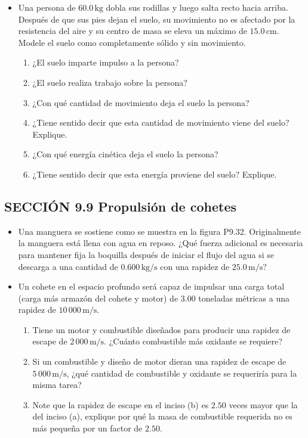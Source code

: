 \documentclass[11pt,a4paper]{article}
\begin{document}
\begin{itemize}
    \item[\textbf{31.}] Una persona de \(60.0\,\text{kg}\) dobla sus rodillas y luego salta recto hacia arriba. Después de que sus pies dejan el suelo, su movimiento no es afectado por la resistencia del aire y su centro de masa se eleva un máximo de \(15.0\,\text{cm}\). Modele el suelo como completamente sólido y sin movimiento.
    \begin{enumerate}
        \item ¿El suelo imparte impulso a la persona?
        \item ¿El suelo realiza trabajo sobre la persona?
        \item ¿Con qué cantidad de movimiento deja el suelo la persona?
        \item ¿Tiene sentido decir que esta cantidad de movimiento viene del suelo? Explique.
        \item ¿Con qué energía cinética deja el suelo la persona?
        \item ¿Tiene sentido decir que esta energía proviene del suelo? Explique.
    \end{enumerate}
    \vspace*{7cm}
\end{itemize}

\subsection*{SECCIÓN 9.9 Propulsión de cohetes}

\begin{itemize}
    \item[\textbf{32.}] Una manguera se sostiene como se muestra en la figura P9.32. Originalmente la manguera está llena con agua en reposo. ¿Qué fuerza adicional es necesaria para mantener fija la boquilla después de iniciar el flujo del agua si se descarga a una cantidad de \(0.600\,\text{kg/s}\) con una rapidez de \(25.0\,\text{m/s}\)?
    \vspace*{6cm}

    \item[\textbf{33.}] Un cohete en el espacio profundo será capaz de impulsar una carga total (carga más armazón del cohete y motor) de \(3.00\) toneladas métricas a una rapidez de \(10\,000\,\text{m/s}\).
    \begin{enumerate}
        \item Tiene un motor y combustible diseñados para producir una rapidez de escape de \(2\,000\,\text{m/s}\). ¿Cuánto combustible más oxidante se requiere?
        \item Si un combustible y diseño de motor dieran una rapidez de escape de \(5\,000\,\text{m/s}\), ¿qué cantidad de combustible y oxidante se requeriría para la misma tarea?
        \item Note que la rapidez de escape en el inciso (b) es \(2.50\) veces mayor que la del inciso (a), explique por qué la masa de combustible requerida no es más pequeña por un factor de \(2.50\).
    \end{enumerate}
    \vspace*{6cm}
\end{itemize}
\end{document}
